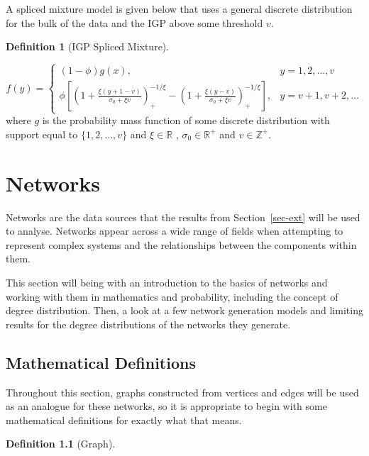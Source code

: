 \documentclass[
  10pt,
  a4paper,
]{scrreprt}
\theoremstyle{definition}
\newtheorem{definition}{Definition}[section]
\theoremstyle{plain}
\theoremstyle{plain}
\theoremstyle{plain}
\theoremstyle{remark}
\begin{document}
{A spliced mixture model is given below that uses a general discrete
distribution for the bulk of the data and the IGP above some threshold
\(v\).

\begin{definition}[IGP Spliced
Mixture]\protect\hypertarget{def-mixigp}{}\label{def-mixigp}

\[
f(y) = \begin{cases}
(1-\phi)g(x), & y=1,2,\ldots, v\\
\phi\left[\left(1+\displaystyle\frac{\xi(y+1-v)}{\sigma_0+\xi v}\right)_+^{-1/\xi}-\left(1+\displaystyle\frac{\xi(y-v)}{\sigma_0+\xi v}\right)_+^{-1/\xi}\right],&y=v+1, v+2,\ldots
\end{cases}
\] where \(g\) is the probability mass function of some discrete
distribution with support equal to \(\{1,2,\ldots,v\}\) and
\(\xi \in \mathbb R\) , \(\sigma_0 \in \mathbb R^+\) and
\(v\in\mathbb Z^+.\)

\end{definition}

\hypertarget{sec-net}{%
\chapter{Networks}\label{sec-net}}

Networks are the data sources that the results from
Section~\ref{sec-ext} will be used to analyse. Networks appear across a
wide range of fields when attempting to represent complex systems and
the relationships between the components within them.

This section will being with an introduction to the basics of networks
and working with them in mathematics and probability, including the
concept of degree distribution. Then, a look at a few network generation
models and limiting results for the degree distributions of the networks
they generate.

\hypertarget{mathematical-definitions}{%
\section{Mathematical Definitions}\label{mathematical-definitions}}

Throughout this section, graphs constructed from vertices and edges will
be used as an analogue for these networks, so it is appropriate to begin
with some mathematical definitions for exactly what that means.

\begin{definition}[Graph]\protect\hypertarget{def-net}{}\label{def-net}


\end{definition}}
\end{document}
